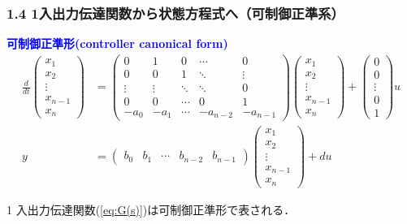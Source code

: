 \documentclass[10pt]{beamer}
\begin{document}
\begin{frame}[t]
\frametitle{1.4 1入出力伝達関数から状態方程式へ{\small （可制御正準系）}}
\textcolor{blue}{\bf {可制御正準形}(controller canonical form)}
\begin{align}
 \frac{d}{dt}
  \left(\begin{array}{c}
         x_1 \\
	 x_2 \\
	 \vdots \\
	 x_{n-1} \\
	 x_n
	\end{array}\right)
  &=
  \left(\begin{array}{ccccc}
     0      & 1      & 0      & \cdots & 0 \\
	 0      & 0      & 1      & \ddots & \vdots \\
	 \vdots & \vdots & \ddots & \ddots & 0 \\
	 0      & 0      & \cdots & 0      & 1 \\
	 -a_0   & -a_1   & \cdots & -a_{n-2} & -a_{n-1}
	\end{array}\right)
  \left(\begin{array}{c}
	 x_1 \\
	 x_2 \\
	 \vdots \\
	 x_{n-1} \\
	 x_n
	\end{array}\right)
  +
  \left(\begin{array}{c}
         0 \\
	 0 \\
	 \vdots \\
	 0 \\
	 1
	\end{array}\right)
  u \\
y &=
 \left(\begin{array}{ccccc}
        b_0 & b_1 & \cdots & b_{n-2} & b_{n-1}
       \end{array}\right)
 \left(\begin{array}{c}
        x_1 \\
	x_2 \\
	\vdots \\
	x_{n-1} \\
	x_n
       \end{array}\right)
 + d u
\end{align}

1 入出力伝達関数(\ref{eq:G(s)})は可制御正準形で表される．
\end{frame}
\end{document}
